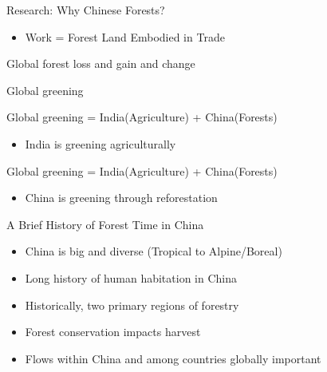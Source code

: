 \documentclass[ignorenonframetext,]{beamer}
\providecommand{\tightlist}{%
  \setlength{\itemsep}{0pt}\setlength{\parskip}{0pt}}
\begin{document}
\begin{frame}{Research: Why Chinese Forests?}
\protect\hypertarget{research-why-chinese-forests}{}

\begin{itemize}
\tightlist
\item
  Work = Forest Land Embodied in Trade
\end{itemize}

\end{frame}

\begin{frame}{Global forest loss and gain and change}
\protect\hypertarget{global-forest-loss-and-gain-and-change}{}

\end{frame}

\begin{frame}{Global greening}
\protect\hypertarget{global-greening}{}

\end{frame}

\begin{frame}{Global greening = India(Agriculture) + China(Forests)}
\protect\hypertarget{global-greening-indiaagriculture-chinaforests}{}

\begin{itemize}
\tightlist
\item
  India is greening agriculturally
\end{itemize}

\end{frame}

\begin{frame}{Global greening = India(Agriculture) + China(Forests)}
\protect\hypertarget{global-greening-indiaagriculture-chinaforests-1}{}

\begin{itemize}
\tightlist
\item
  China is greening through reforestation
\end{itemize}

\end{frame}

\begin{frame}{A Brief History of Forest Time in China}
\protect\hypertarget{a-brief-history-of-forest-time-in-china}{}

\begin{itemize}
\tightlist
\item
  China is big and diverse (Tropical to Alpine/Boreal)
\item
  Long history of human habitation in China
\item
  Historically, two primary regions of forestry
\item
  Forest conservation impacts harvest
\item
  Flows within China and among countries globally important
\end{itemize}

\end{frame}
\end{document}
